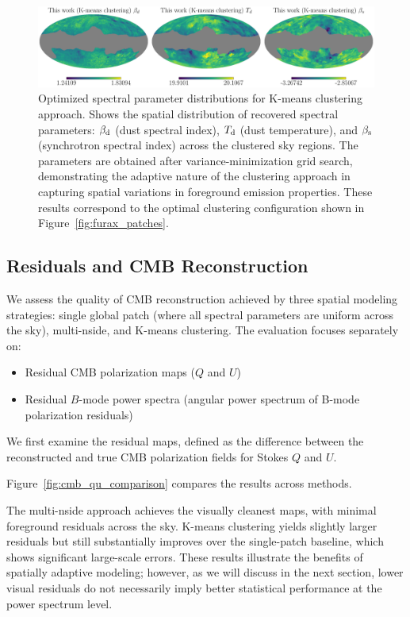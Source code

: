 \documentclass[fleqn,usenatbib]{mnras}
\begin{document}
\begin{figure}
    \centering
    \includegraphics[width=\linewidth]{figures/params_kmeans.pdf}
    \caption{
    Optimized spectral parameter distributions for K-means clustering approach. 
    Shows the spatial distribution of recovered spectral parameters: \( \beta_{\rm d} \) (dust spectral index), \( T_{\rm d} \) (dust temperature), and \( \beta_{\rm s} \) (synchrotron spectral index) across the clustered sky regions. 
    The parameters are obtained after variance-minimization grid search, demonstrating the adaptive nature of the clustering approach in capturing spatial variations in foreground emission properties.
    These results correspond to the optimal clustering configuration shown in Figure~\ref{fig:furax_patches}.
    }
    \label{fig:params_kmeans}
\end{figure}

\subsection{Residuals and CMB Reconstruction}
\label{sec:residuals_reconstruction}

We assess the quality of CMB reconstruction achieved by three spatial modeling strategies: single global patch (where all spectral parameters are uniform across the sky), multi-nside, and K-means clustering.  
The evaluation focuses separately on:
\begin{itemize}
    \item Residual CMB polarization maps (\( Q \) and \( U \))
    \item Residual \( B \)-mode power spectra (angular power spectrum of B-mode polarization residuals)
\end{itemize}

We first examine the residual maps, defined as the difference between the reconstructed and true CMB polarization fields for Stokes \( Q \) and \( U \).

Figure~\ref{fig:cmb_qu_comparison} compares the results across methods.

The multi-nside approach achieves the visually cleanest maps, with minimal foreground residuals across the sky.  
K-means clustering yields slightly larger residuals but still substantially improves over the single-patch baseline, which shows significant large-scale errors.  
These results illustrate the benefits of spatially adaptive modeling; however, as we will discuss in the next section, lower visual residuals do not necessarily imply better statistical performance at the power spectrum level.
\end{document}

